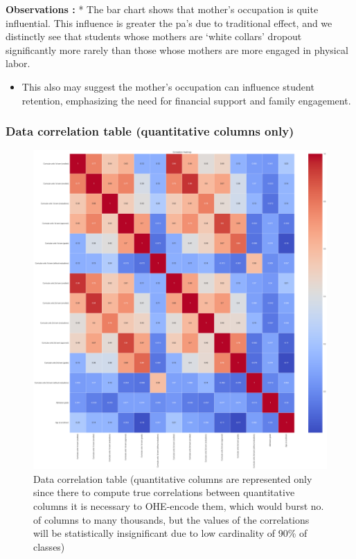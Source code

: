 \documentclass[
  letterpaper,
  DIV=11,
  numbers=noendperiod]{scrartcl}
\providecommand{\tightlist}{%
  \setlength{\itemsep}{0pt}\setlength{\parskip}{0pt}}\usepackage{longtable,booktabs,array}
\begin{document}
\textbf{Observations :} * The bar chart shows that mother's occupation
is quite influential. This influence is greater the pa's due to
traditional effect, and we distinctly see that students whose mothers
are \enquote*{white collars} dropout significantly more rarely than
those whose mothers are more engaged in physical labor.

\begin{itemize}
\tightlist
\item
  This also may suggest the mother's occupation can influence student
  retention, emphasizing the need for financial support and family
  engagement.
\end{itemize}

\hypertarget{data-correlation-table-quantitative-columns-only}{%
\subsubsection{Data correlation table (quantitative columns
only)}\label{data-correlation-table-quantitative-columns-only}}

\begin{figure}

{\centering \includegraphics{report_AzadhdhinNedalYunisAlFraijat_files/figure-pdf/tab-correlation-output-1.png}

}

\caption{Data correlation table (quantitative columns are represented
only since there to compute true correlations between quantitative
columns it is necessary to OHE-encode them, which would burst no. of
columns to many thousands, but the values of the correlations will be
statistically insignificant due to low cardinality of 90\% of classes)}

\end{figure}
\end{document}
